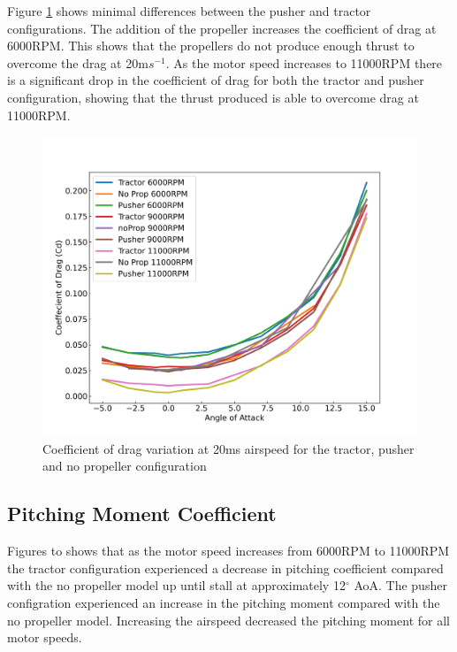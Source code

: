 Figure \ref{fig:Cd_20ms} shows minimal differences between the pusher and tractor configurations. The addition of the propeller increases the coefficient of drag at 6000RPM. This shows that the propellers do not produce enough thrust to overcome the drag at 20m$s^{-1}$. As the motor speed increases to 11000RPM there is a significant drop in the coefficient of drag for both the tractor and pusher configuration, showing that the thrust produced is able to overcome drag at 11000RPM. 
\begin{figure}[H]
    \centering
    \includegraphics[scale = 0.7]{05_Results/Figs/Cd/20ms_Cd.png}
    \caption{Coefficient of drag variation at 20ms airspeed for the tractor, pusher and no propeller configuration}
    \label{fig:Cd_20ms}
\end{figure}

\subsection{Pitching Moment Coefficient}

Figures  to  shows that as the motor speed increases from 6000RPM to 11000RPM the tractor configuration experienced a decrease in pitching coefficient compared with the no propeller model up until stall at approximately 12$^\circ$ AoA. The pusher configration experienced an increase in the pitching moment compared with the no propeller model. Increasing the airspeed decreased the pitching moment for all motor speeds.

